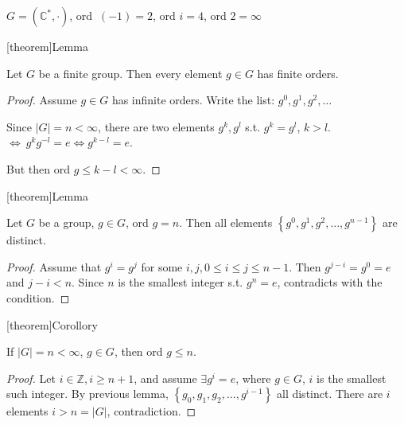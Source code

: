 \documentclass[12pt]{report}
\theoremstyle{definition}
\begin{document}
\begin{ex}
    $G = (\mathbb{C}^{*}, \cdot)$, ord $\ (-1) = 2$, ord $i = 4$, ord $2 = \infty$
\end{ex}

[theorem]{Lemma}
\begin{finite cyclic group}
    Let $G$ be a finite group. Then every element $g \in G$ has finite orders.%
\end{finite cyclic group}

\begin{proof}
    Assume $g \in G$ has infinite orders. %
    Write the list: $g^{0}, g^{1}, g^{2}, \ldots$

    Since $|G| = n < \infty$, there are two elements 
    $g^{k}, g^{l}$ s.t. $g^{k} = g^{l}$, $k > l$.
    $\iff\ g^{k} g^{-l} = e \iff g^{k - l} = e$.%

    But then ord $g \le k - l < \infty$.%
\end{proof}

[theorem]{Lemma}
\begin{distinct element in a group}
    Let $G$ be a group, $g \in G$, ord $g = n$. %
    Then all elements $\left\{g^0, g^1, g^2, \ldots, g^{n-1}\right\} $ are distinct.
\end{distinct element in a group}

\begin{proof}
    Assume that $g^{i} = g^{j}$ for some $i, j, 0 \le i \le j \le n - 1$. %
    Then $g^{j-i} = g^0 = e$ and $j-i < n$. Since $n$ is the smallest integer s.t. $g^{n} = e$,
    contradicts with the condition.
\end{proof}

[theorem]{Corollory}
\begin{ord g <= n}
    If $|G| = n < \infty$, $g \in G$, then ord $g \le n$. %
\end{ord g <= n}

\begin{proof}
    Let $i \in{}\mathbb{Z}, i \ge{}n + 1$, and assume $\exists{}g^{i} = e$,
    where $g \in{}G$, $i$ is the smallest such integer.
    By previous lemma, $\left\{g_0, g_1, g_2, \ldots, g^{i-1}\right\} $ all distinct.
    There are $i$ elements $i > n = |G|$, contradiction.
\end{proof}
\end{document}
